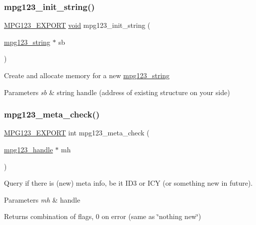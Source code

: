\subsubsection{\texorpdfstring{mpg123\_init\_string()}{mpg123\_init\_string()}}
{\footnotesize\ttfamily \mbox{\hyperlink{mpg123_8h_a2ba98cfba3f760879df70e755b2a61cc}{M\+P\+G123\+\_\+\+E\+X\+P\+O\+RT}} \mbox{\hyperlink{_s_d_l__opengles2__gl2ext_8h_ae5d8fa23ad07c48bb609509eae494c95}{void}} mpg123\+\_\+init\+\_\+string (\begin{DoxyParamCaption}\item[{\mbox{\hyperlink{structmpg123__string}{mpg123\+\_\+string}} $\ast$}]{sb }\end{DoxyParamCaption})}

Create and allocate memory for a new \mbox{\hyperlink{structmpg123__string}{mpg123\+\_\+string}} 
\begin{DoxyParams}{Parameters}
{\em sb} & string handle (address of existing structure on your side) \\
\hline
\end{DoxyParams}
\mbox{\label{group__mpg123__metadata_ga1cd6279a1273f63eb8dcc8a554d815bb}} 
\subsubsection{\texorpdfstring{mpg123\_meta\_check()}{mpg123\_meta\_check()}}
{\footnotesize\ttfamily \mbox{\hyperlink{mpg123_8h_a2ba98cfba3f760879df70e755b2a61cc}{M\+P\+G123\+\_\+\+E\+X\+P\+O\+RT}} int mpg123\+\_\+meta\+\_\+check (\begin{DoxyParamCaption}\item[{\mbox{\hyperlink{group__mpg123__init_ga6728e2839a395f3a07d4514da659faca}{mpg123\+\_\+handle}} $\ast$}]{mh }\end{DoxyParamCaption})}

Query if there is (new) meta info, be it I\+D3 or I\+CY (or something new in future). 
\begin{DoxyParams}{Parameters}
{\em mh} & handle \\
\hline
\end{DoxyParams}
\begin{DoxyReturn}{Returns}
combination of flags, 0 on error (same as \char`\"{}nothing new\char`\"{}) 
\end{DoxyReturn}
\mbox{\label{group__mpg123__metadata_ga4bca410c7589658fb8379b3cf3fa3e05}} 
